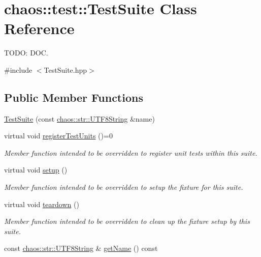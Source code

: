 \hypertarget{classchaos_1_1test_1_1_test_suite}{\section{chaos\-:\-:test\-:\-:Test\-Suite Class Reference}
\label{classchaos_1_1test_1_1_test_suite}
}


T\-O\-D\-O\-: D\-O\-C.  




{\ttfamily \#include $<$Test\-Suite.\-hpp$>$}

\subsection*{Public Member Functions}
\begin{DoxyCompactItemize}
\item 
\hyperlink{classchaos_1_1test_1_1_test_suite_afcbbc804b722ef991edcff4841cc454e}{Test\-Suite} (const \hyperlink{classchaos_1_1str_1_1_u_t_f8_string}{chaos\-::str\-::\-U\-T\-F8\-String} \&name)
\item 
virtual void \hyperlink{classchaos_1_1test_1_1_test_suite_a3d9c8c7f0ff3f7b1f74717abc747b3fd}{register\-Test\-Units} ()=0
\begin{DoxyCompactList}\small\item\em Member function intended to be overridden to register unit tests within this suite. \end{DoxyCompactList}\item 
virtual void \hyperlink{classchaos_1_1test_1_1_test_suite_ad0a1e7224769042c7ef55c1cd6192982}{setup} ()
\begin{DoxyCompactList}\small\item\em Member function intended to be overridden to setup the fixture for this suite. \end{DoxyCompactList}\item 
virtual void \hyperlink{classchaos_1_1test_1_1_test_suite_a6ff5bccbbc0f6590f9c921734ed40029}{teardown} ()
\begin{DoxyCompactList}\small\item\em Member function intended to be overridden to clean up the fixture setup by this suite. \end{DoxyCompactList}\item 
const \hyperlink{classchaos_1_1str_1_1_u_t_f8_string}{chaos\-::str\-::\-U\-T\-F8\-String} \& \hyperlink{classchaos_1_1test_1_1_test_suite_aeb9155de71eb9259c987a207bd297fe4}{get\-Name} () const 
\end{DoxyCompactItemize}
